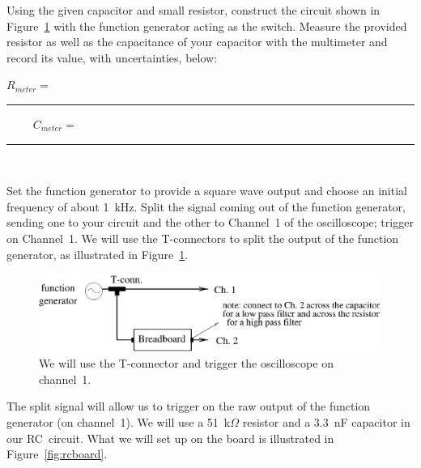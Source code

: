 \noindent Using the given capacitor and small resistor, 
construct the circuit
shown in Figure~\ref{fig:wiring} with the function generator acting as the
switch. Measure the provided resistor as well as the capacitance of your capacitor
with the multimeter and record its value, with uncertainties, below:
\begin{center}
$R_{meter}=$~ \rule{3cm}{.1mm}~~~~
$C_{meter}=$~ \rule{3cm}{.1mm} \\
\end{center}
\noindent Set the function generator to provide a square wave output 
and choose an initial frequency of about 1~kHz. Split the signal coming out of 
the function generator, sending one to your circuit and the other to Channel~1
of the oscilloscope; trigger on Channel~1. 
We will use the T-connectors to split the output of the function generator, as
illustrated in Figure~\ref{fig:wiring}.
\begin{figure}[htb]
\epsfxsize=15cm
\centering 
\includegraphics[scale=0.5]{5_rccircuits/wiring.eps}
\caption{We will use the T-connector and trigger the oscilloscope on 
channel~1.}
\label{fig:wiring}
\end{figure}
The split signal will allow us to trigger on the raw output of the
function generator (on channel~1). We will use a 51~k$\Omega$ resistor and a
3.3~nF capacitor in our RC~circuit.
What we will set up on the board is illustrated in Figure~\ref{fig:rcboard}.

